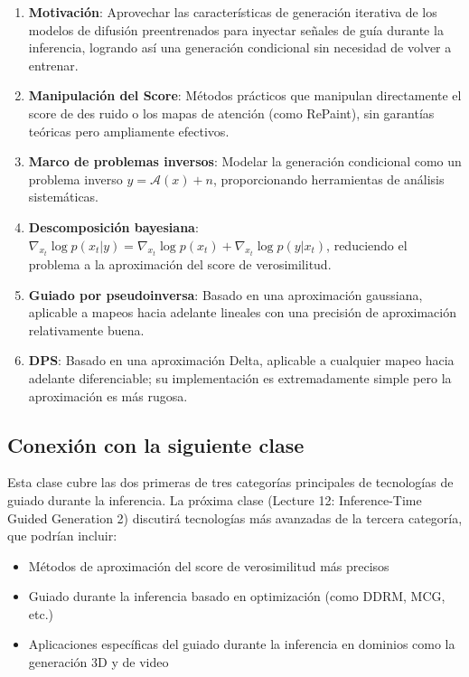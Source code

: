 \begin{enumerate}
    \item \textbf{Motivación}: Aprovechar las características de generación iterativa de los modelos de difusión preentrenados para inyectar señales de guía durante la inferencia, logrando así una generación condicional sin necesidad de volver a entrenar.
    \item \textbf{Manipulación del Score}: Métodos prácticos que manipulan directamente el score de des ruido o los mapas de atención (como RePaint), sin garantías teóricas pero ampliamente efectivos.
    \item \textbf{Marco de problemas inversos}: Modelar la generación condicional como un problema inverso $y = \mathcal{A}(x) + n$, proporcionando herramientas de análisis sistemáticas.
    \item \textbf{Descomposición bayesiana}: $\nabla_{x_t} \log p(x_t|y) = \nabla_{x_t} \log p(x_t) + \nabla_{x_t} \log p(y|x_t)$, reduciendo el problema a la aproximación del score de verosimilitud.
    \item \textbf{Guiado por pseudoinversa}: Basado en una aproximación gaussiana, aplicable a mapeos hacia adelante lineales con una precisión de aproximación relativamente buena.
    \item \textbf{DPS}: Basado en una aproximación Delta, aplicable a cualquier mapeo hacia adelante diferenciable; su implementación es extremadamente simple pero la aproximación es más rugosa.
\end{enumerate}

\subsection{Conexión con la siguiente clase}

Esta clase cubre las dos primeras de tres categorías principales de tecnologías de guiado durante la inferencia. La próxima clase (Lecture 12: Inference-Time Guided Generation 2) discutirá tecnologías más avanzadas de la tercera categoría, que podrían incluir:
\begin{itemize}
    \item Métodos de aproximación del score de verosimilitud más precisos
    \item Guiado durante la inferencia basado en optimización (como DDRM, MCG, etc.)
    \item Aplicaciones específicas del guiado durante la inferencia en dominios como la generación 3D y de video
\end{itemize}

